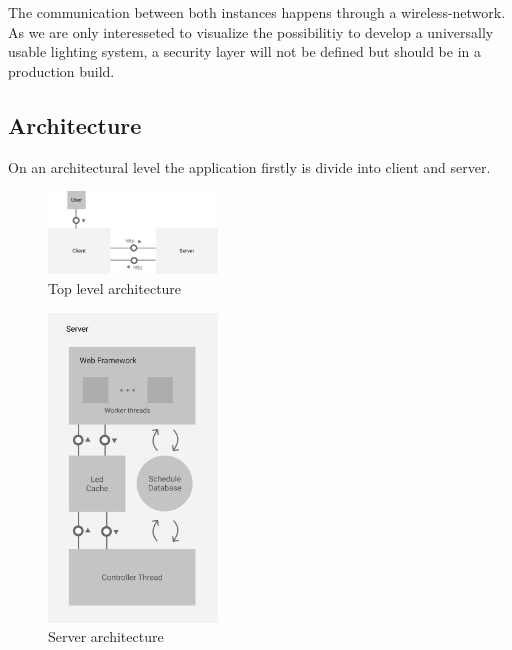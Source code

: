 \documentclass[conference]{IEEEtran}
\begin{document}
The communication between both instances happens through a wireless-network. As we are only interesseted to visualize the possibilitiy 
to develop a universally usable lighting system, a security layer will not be defined but should be in a production build. 


\subsection{Architecture}
On an architectural level the application firstly is divide into client and server.

\begin{figure}
    \centering
    \includegraphics[width=0.4\textwidth]{top_level_architecture}
    \caption{Top level architecture}
\end{figure}



\begin{figure}
    \centering
    \includegraphics[width=0.4\textwidth]{server_architecture}
    \caption{Server architecture}
\end{figure}
\end{document}
